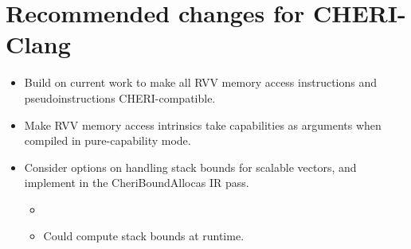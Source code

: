 \section{Recommended changes for CHERI-Clang}
\begin{itemize}
    \item Build on current work to make all RVV memory access instructions and pseudoinstructions CHERI-compatible.
    \item Make RVV memory access intrinsics take capabilities as arguments when compiled in pure-capability mode.
    \item Consider options on handling stack bounds for scalable vectors, and implement in the CheriBoundAllocas IR pass.
    \begin{itemize}
        \item {}
        \item Could compute stack bounds at runtime.
    \end{itemize}
\end{itemize}
